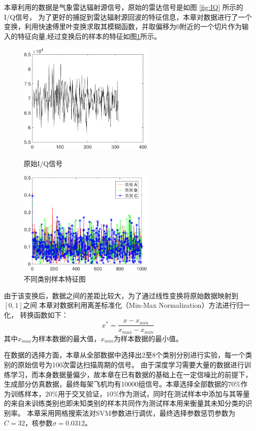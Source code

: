 本章利用的数据是气象雷达辐射源信号，原始的雷达信号是如图 \ref{fig:IQ} 所示的I/Q信号，
为了更好的捕捉到雷达辐射源回波的特征信息，本章对数据进行了一个变换，利用快速傅里叶变换求取其模糊函数，并取偏移为0附近的一个切片作为输入的特征向量,经过变换后的样本的特征如图\ref{fig:diff_data}所示。
\begin{figure}[hbt]
	\centering
	\begin{minipage}{7cm}
		\centering
		\includegraphics[width=6.67cm]{figures/emitter/IQA}
		\caption{原始I/Q信号}
		\label{fig:IQ}
	\end{minipage}
	\hspace{10pt}
	\begin{minipage}{7cm}
		\centering
		\includegraphics[width=6.67cm]{figures/emitter/diff_data}
		\caption{不同类别样本特征图}
		\label{fig:diff_data}
	\end{minipage}
\end{figure}
由于该变换后，数据之间的差距比较大，为了通过线性变换将原始数据映射到$[0 , 1]$之间
本章对数据利用离差标准化（Min-Max Normalization）方法进行归一化，
转换函数如下：
\begin{equation}
x^{*}=\frac{x-x_{min}}{x_{max}-x_{min}}
\end{equation}
其中$x_{max}$为样本数据的最大值，$x_{min}$为样本数据的最小值。

在数据的选择方面，本章从全部数据中选择出2至8个类别分别进行实验，每一个类别的原始信号为100次雷达扫描周期的信号。
由于深度学习需要大量的数据进行训练学习，而本身数据量偏少，故本章在已有数据的基础上在一定信噪比的前提下，生成部分仿真数据，最终每架飞机均有10000组信号。本章选择全部数据的$70\%$作为训练样本，$20\%$用于交叉验证，$10\%$作为测试，同时在测试样本中添加与其等量的来自未训练类别也即未知类别的样本共同作为测试样本用来衡量其未知分类的识别率。
本章采用网格搜索法对SVM参数进行调优，最终选择参数惩罚参数为$C=32$，核参数$\sigma=0.0312$。

